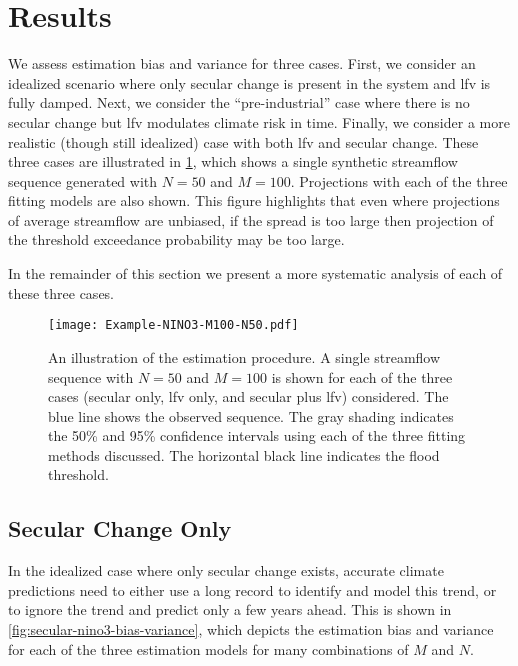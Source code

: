 \documentclass[
]{agujournal2018}
\begin{document}
\section{Results}\label{sec:results}

We assess estimation bias and variance for three cases.
First, we consider an idealized scenario where only secular change is present in the system and \gls{lfv} is fully damped.
Next, we consider the ``pre-industrial'' case where there is no secular change but \gls{lfv} modulates climate risk in time.
Finally, we consider a more realistic (though still idealized) case with both \gls{lfv} and secular change.
These three cases are illustrated in \cref{fig:example-fit}, which shows a single synthetic streamflow sequence generated with $N=50$ and $M=100$.
Projections with each of the three fitting models are also shown.
This figure highlights that even where projections of average streamflow are unbiased, if the spread is too large then projection of the threshold exceedance probability may be too large.

In the remainder of this section we present a more systematic analysis of each of these three cases.
\begin{figure}
  \texttt{[image: Example-NINO3-M100-N50.pdf]}
  \caption{
    An illustration of the estimation procedure.
    A single streamflow sequence with $N=50$ and $M=100$ is shown for each of the three cases (secular only, \gls{lfv} only, and secular plus \gls{lfv}) considered.
    The blue line shows the observed sequence.
    The gray shading indicates the 50\% and 95\% confidence intervals using each of the three fitting methods discussed.
    The horizontal black line indicates the flood threshold.
  }\label{fig:example-fit}
\end{figure}

\subsection{Secular Change Only}

In the idealized case where only secular change exists, accurate climate predictions need to either use a long record to identify and model this trend, or to ignore the trend and predict only a few years ahead.
This is shown in \cref{fig:secular-nino3-bias-variance}, which depicts the estimation bias and variance for each of the three estimation models for many combinations of $M$ and $N$.
\end{document}
